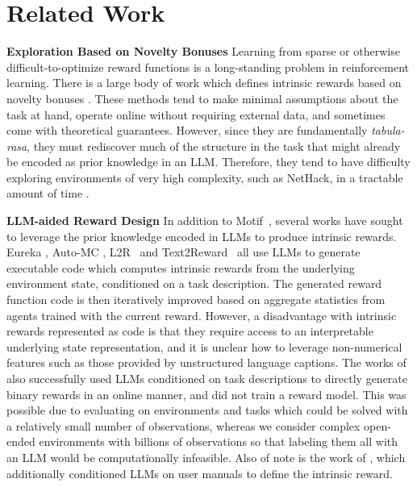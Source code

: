 \section{Related Work}
\label{sec:related}
\textbf{Exploration Based on Novelty Bonuses} Learning from sparse or otherwise difficult-to-optimize reward functions is a long-standing problem in reinforcement learning.
%
There is a large body of work which defines intrinsic rewards based on novelty bonuses \citep{schmidhuber1991possibility, E3, Rmax, stadie2015incentivizing,  PseudoCounts, ICM, RND, max, RIDE, ecoffet2019go, PCPG, NovelD, E3B,lu2024intelligent}. These methods tend to make minimal assumptions about the task at hand, operate online without requiring external data, and sometimes come with theoretical guarantees. However, since they are fundamentally \textit{tabula-rasa}, they must rediscover much of the structure in the task that might already be encoded as prior knowledge in an LLM. Therefore, they tend to have difficulty exploring environments of very high complexity, such as NetHack, in a tractable amount of time \citep{klissarovdoro2023motif}.

\textbf{LLM-aided Reward Design}
In addition to Motif~\citep{klissarovdoro2023motif}, several works have sought to leverage the prior knowledge encoded in LLMs to produce intrinsic rewards.
Eureka \citep{ma2023eureka}, Auto-MC \citep{li2024auto}, L2R~\citep{yu2023language} and Text2Reward~\citep{xie2023text2reward}
all use LLMs to generate executable code which computes intrinsic rewards from the underlying environment state, conditioned on a task description. The generated reward function code is then iteratively improved based on aggregate statistics from agents trained with the current reward.
%
However, a disadvantage with intrinsic rewards represented as code is that they require access to an interpretable underlying state representation, and it is unclear how to leverage non-numerical features such as those provided by unstructured language captions.
The works of \citet{kwon2023reward, chu2023accelerating} also successfully used LLMs conditioned on task descriptions to directly generate binary rewards in an online manner, and did not train a reward model. This was possible due to evaluating on environments and tasks which could be solved with a relatively small number of observations, whereas we consider complex open-ended environments with billions of observations so that labeling them all with an LLM would be computationally infeasible. Also of note is the work of \citet{wu2024read}, which additionally conditioned LLMs on user manuals to define the intrinsic reward. 



